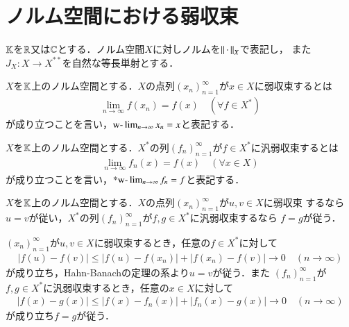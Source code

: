 \section{ノルム空間における弱収束}

	$\mathbb{K}$を$\mathbb{R}$又は$\mathbb{C}$とする．ノルム空間$X$に対しノルムを$\left\|\, \cdot\, \right\|_{X}$で表記し，
	また$J_X: X \rightarrow X^{**}$を自然な等長単射とする．
	\begin{screen}
		\begin{dfn}[弱収束]
			$X$を$\mathbb{K}$上のノルム空間とする．$X$の点列$(x_n)_{n=1}^{\infty}$が$x \in X$に弱収束するとは
			\begin{align}
				\lim_{n \to \infty} f(x_n) = f(x) \quad (\forall f \in X^*)
			\end{align}
			が成り立つことを言い，$\mbox{w-}\lim_{n \to \infty} x_n = x$と表記する．
		\end{dfn}
	\end{screen}
	
	\begin{screen}
		\begin{dfn}[汎弱収束]
			$X$を$\mathbb{K}$上のノルム空間とする．$X^*$の列$(f_n)_{n=1}^{\infty}$が$f \in X^*$に汎弱収束するとは
			\begin{align}
				\lim_{n \to \infty} f_n(x) = f(x) \quad (\forall x \in X)
			\end{align}
			が成り立つことを言い，$\mbox{*w-}\lim_{n \to \infty} f_n = f$と表記する．
		\end{dfn}
	\end{screen}
	
	\begin{screen}
		\begin{thm}[弱収束及び汎弱収束極限の一意性]
			$X$を$\mathbb{K}$上のノルム空間とする．$X$の点列$(x_n)_{n=1}^{\infty}$が$u,v \in X$に弱収束
			するなら$u = v$が従い，$X^*$の列$(f_n)_{n=1}^{\infty}$が$f,g \in X^*$に汎弱収束するなら
			$f = g$が従う．
		\end{thm}
	\end{screen}
	
	\begin{prf}
		$(x_n)_{n=1}^{\infty}$が$u,v \in X$に弱収束するとき，任意の$f \in X^*$に対して
		\begin{align}
			\left| f(u) - f(v) \right| \leq \left| f(u) - f(x_n) \right| + \left| f(x_n) - f(v) \right| \longrightarrow 0 
			\quad (n \longrightarrow \infty)
		\end{align}
		が成り立ち，Hahn-Banachの定理の系より$u = v$が従う．また
		$(f_n)_{n=1}^{\infty}$が$f,g \in X^*$に汎弱収束するとき，任意の$x \in X$に対して
		\begin{align}
			\left| f(x) - g(x) \right| \leq \left| f(x) - f_n(x) \right| + \left| f_n(x) - g(x) \right| \longrightarrow 0 
			\quad (n \longrightarrow \infty)
		\end{align}
		が成り立ち$f = g$が従う．
		\QED
	\end{prf}
	
